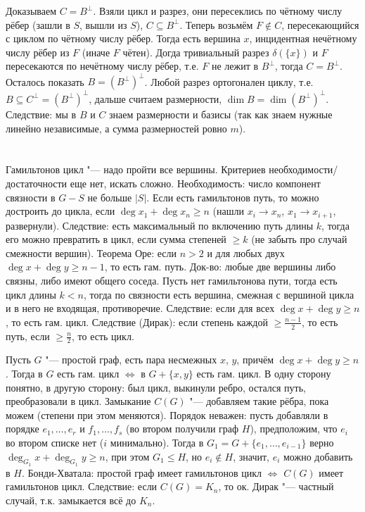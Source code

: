 Доказываем $C=B^\bot$.
Взяли цикл и разрез, они пересеклись по чётному числу рёбер (зашли в $S$, вышли из $S$),
$C\subseteq B^\bot$.
Теперь возьмём $F\notin C$, пересекающийся с циклом по чётному числу рёбер.
Тогда есть вершина $x$, инцидентная нечётному числу рёбер из $F$ (иначе $F$ чётен).
Догда тривиальный разрез $\delta(\{x\})$ и $F$ пересекаются по нечётному числу рёбер,
т.е. $F$ не лежит в $B^\bot$, тогда $C=B^\bot$.
Осталось показать $B=(B^\bot)^\bot$.
Любой разрез ортогонален циклу, т.е. $B\subseteq C^\bot = (B^\bot)^\bot$,
дальше считаем размерности, $\dim B = \dim (B^\bot)^\bot$.
Следствие: мы в $B$ и $C$ знаем размерности и базисы (так как знаем нужные линейно независимые,
а сумма размерностей ровно $m$).

\section{} %
Гамильтонов цикл "--- надо пройти все вершины.
Критериев необходимости/достаточности еще нет, искать сложно.
Необходимость: число компонент связности в $G-S$ не больше $|S|$.
Если есть гамильтонов путь, то можно достроить до цикла, если $\deg x_1 + \deg x_n \ge n$
(нашли $x_i \to x_n$, $x_1 \to x_{i+1}$, развернули).
Следствие: есть максимальный по включению путь длины $k$, тогда его можно превратить в цикл,
если сумма степеней $\ge k$ (не забыть про случай смежности вершин).
Теорема Оре: если $n>2$ и для любых двух $\deg x + \deg y \ge n - 1$, то есть гам. путь.
Док-во: любые две вершины либо связны, либо имеют общего соседа.
Пусть нет гамильтонова пути, тогда есть цикл длины $k<n$, тогда по связности
есть вершина, смежная с вершиной цикла и в него не входящая, противоречие.
Следствие: если для всех $\deg x + \deg y \ge n$, то есть гам. цикл.
Следствие (Дирак): если степень каждой $\ge \frac{n-1}{2}$, то есть путь, если
$\ge \frac{n}{2}$, то есть цикл.

Пусть $G$ "--- простой граф, есть пара несмежных $x$, $y$, причём
$\deg x + \deg y \ge n$.
Тогда в $G$ есть гам. цикл $\iff$ в $G+\{x, y\}$ есть гам. цикл.
В одну сторону понятно, в другую сторону: был цикл, выкинули ребро,
остался путь, преобразовали в цикл.
Замыкание $C(G)$ "--- добавляем такие рёбра, пока можем (степени при этом меняются).
Порядок неважен: пусть добавляли в порядке $e_1, \dots, e_r$ и $f_1, \dots, f_s$ (во втором получили граф $H$),
предположим, что $e_i$ во втором списке нет ($i$ минимально).
Тогда в $G_1=G+\{e_1, \dots, e_{i-1}\}$ верно $\deg_{G_1} x + \deg_{G_1} y \ge n$,
при этом $G_1 \le H$, но $e_i \notin H$, значит, $e_i$ можно добавить в $H$.
Бонди-Хватала: простой граф имеет гамильтонов цикл $\iff$ $C(G)$ имеет гамильтонов цикл.
Следствие: если $C(G)=K_n$, то ок.
Дирак "--- частный случай, т.к. замыкается всё до $K_n$.

